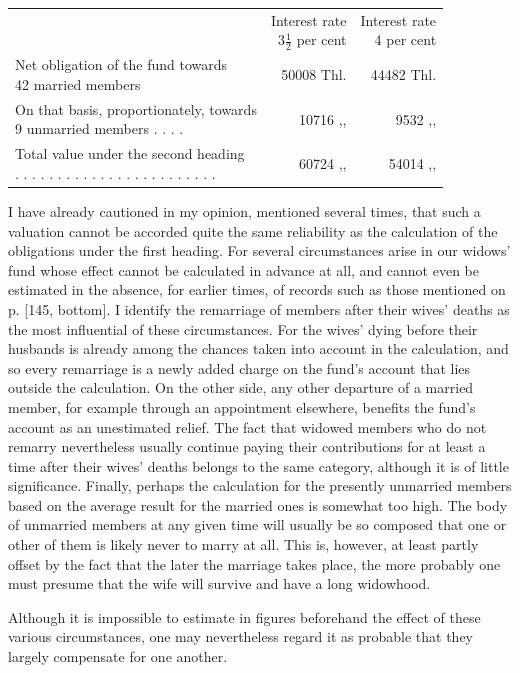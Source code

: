 \begin{center}
\footnotesize\setlength{\tabcolsep}{3pt}
\begin{tabular}{l r|r}
&\shortstack{Interest rate\\\(3\tfrac{1}{2}\) per cent}&\shortstack{Interest rate\\4 per cent}\\
\shortstack[l]{Net obligation of the fund towards\\42 married members}&50008 Thl.&44482 Thl.\\
\shortstack[l]{On that basis, proportionately, towards\\9 unmarried members . . . .}&10716 ,, &9532 ,, \\[5pt]
\shortstack[l]{Total value under the second heading\\ . . . . . . . . . . . . . . . . . . . . . . . .}&60724 ,, &54014 ,,
\end{tabular}
\end{center}
\noindent\hspace*{\parindent}I have already cautioned in my opinion, mentioned several times, that such a valuation cannot be accorded quite the same reliability as the calculation of the obligations under the first heading. For several circumstances arise in our widows' fund whose effect cannot be calculated in advance at all, and cannot even be estimated in the absence, for earlier times, of records such as those mentioned on p. [145, bottom]. I identify the remarriage of members after their wives' deaths as the most influential of these circumstances. For the wives' dying before their husbands is already among the chances taken into account in the calculation, and so every remarriage is a newly added charge on the fund's account that lies outside the calculation. On the other side, any other departure of a married member, for example through an appointment elsewhere, benefits the fund's account as an unestimated relief. The fact that widowed members who do not remarry nevertheless usually continue paying their contributions for at least a time after their wives' deaths belongs to the same category, although it is of little significance. Finally, perhaps the calculation for the presently unmarried members based on the average result for the married ones is somewhat too high. The body of unmarried members at any given time will usually be so composed that one or other of them is likely never to marry at all. This is, however, at least partly offset by the fact that the later the marriage takes place, the more probably one must presume that the wife will survive and have a long widowhood.

Although it is impossible to estimate in figures beforehand the effect of these various circumstances, one may nevertheless regard it as probable that they largely compensate for one another.

